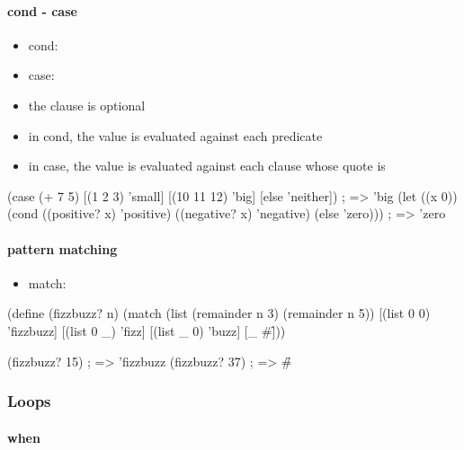 \documentclass[a4paper,landscape,10pt]{article}
\begin{document}
\begin{multicols*}{2}
  \paragraph{cond - case}

  \begin{itemize}
    \item cond: 
    \item case: 
    \item the  clause is optional
    \item in cond, the value is evaluated against each predicate
    \item in case, the value is evaluated against each clause whose quote is 
  \end{itemize}

  \begin{racket}
(case (+ 7 5)
  [(1 2 3) 'small]
  [(10 11 12) 'big]
  [else 'neither]) ; => 'big
(let ((x 0))
  (cond ((positive? x) 'positive)
  ((negative? x) 'negative)
  (else 'zero))) ; => 'zero
  \end{racket}

  \paragraph{pattern matching}

  \begin{itemize}
    \item match: 
  \end{itemize}

  \begin{racket}
(define (fizzbuzz? n)
  (match (list (remainder n 3) (remainder n 5))
    [(list 0 0) 'fizzbuzz]
    [(list 0 _) 'fizz]
    [(list _ 0) 'buzz]
    [_          #\f]))

(fizzbuzz? 15) ; => 'fizzbuzz
(fizzbuzz? 37) ; => #\f
  \end{racket}

  \breakcolumn

  \subsubsection{Loops}

  \paragraph{when}


\end{multicols*}
\end{document}
